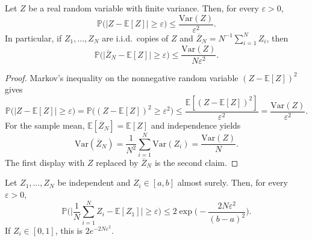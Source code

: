 \documentclass[11pt,a4paper]{article}
\theoremstyle{definition}
\begin{document}
\begin{lemma}[Chebyshev]
\label{lem:spr2025-nlp-chebyshev}
Let \(Z\) be a real random variable with finite variance. Then, for every \(\varepsilon>0\),
\[
\mathbb{P}\bigl(\lvert Z-\mathbb{E}[Z]\rvert\ge\varepsilon\bigr)
\le
\frac{\mathrm{Var}(Z)}{\varepsilon^2}.
\]
In particular, if \(Z_1,\ldots,Z_N\) are i.i.d.\ copies of \(Z\) and \(\overline{Z}_N=N^{-1}\sum_{i=1}^{N}Z_i\), then
\[
\mathbb{P}\bigl(\lvert\overline{Z}_N-\mathbb{E}[Z]\rvert\ge\varepsilon\bigr)
\le
\frac{\mathrm{Var}(Z)}{N\varepsilon^2}.
\]
\end{lemma}

\begin{proof}
Markov's inequality on the nonnegative random variable \((Z-\mathbb{E}[Z])^2\) gives
\[
\mathbb{P}\bigl(\lvert Z-\mathbb{E}[Z]\rvert\ge\varepsilon\bigr)
=\mathbb{P}\bigl((Z-\mathbb{E}[Z])^2\ge\varepsilon^2\bigr)
\le
\frac{\mathbb{E}[(Z-\mathbb{E}[Z])^2]}{\varepsilon^2}
=\frac{\mathrm{Var}(Z)}{\varepsilon^2}.
\]
For the sample mean, \(\mathbb{E}[\overline{Z}_N]=\mathbb{E}[Z]\) and independence yields
\[
\mathrm{Var}(\overline{Z}_N)
=\frac{1}{N^2}\sum_{i=1}^{N}\mathrm{Var}(Z_i)
=\frac{\mathrm{Var}(Z)}{N}.
\]
The first display with \(Z\) replaced by \(\overline{Z}_N\) is the second claim.
\end{proof}

\begin{lemma}[Hoeffding]
\label{lem:spr2025-nlp-hoeffding}
Let \(Z_1,\ldots,Z_N\) be independent and \(Z_i\in[a,b]\) almost surely. Then, for every \(\varepsilon>0\),
\[
\mathbb{P}\Biggl(\Biggl\lvert\frac{1}{N}\sum_{i=1}^{N}Z_i-\mathbb{E}[Z_1]\Biggr\rvert\ge\varepsilon\Biggr)
\le
2\exp\Biggl(-\frac{2N\varepsilon^2}{(b-a)^2}\Biggr).
\]
If \(Z_i\in[0,1]\), this is \(2e^{-2N\varepsilon^2}\).
\end{lemma}
\end{document}
